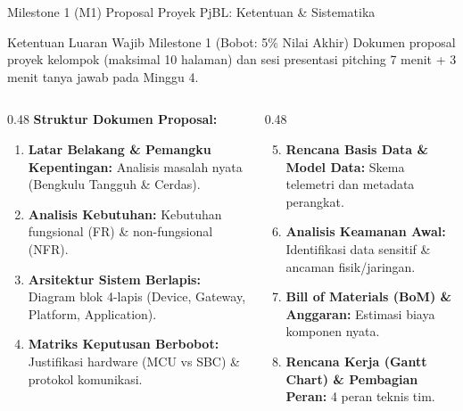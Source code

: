 \documentclass[aspectratio=169,10pt]{beamer}
\begin{document}
\begin{frame}{Milestone 1 (M1) Proposal Proyek PjBL: Ketentuan \& Sistematika}
    \begin{block}{Ketentuan Luaran Wajib Milestone 1 (Bobot: 5\% Nilai Akhir)}
        Dokumen proposal proyek kelompok (maksimal 10 halaman) dan sesi presentasi pitching 7 menit + 3 menit tanya jawab pada Minggu 4.
    \end{block}
    \vspace{4pt}
    \begin{columns}[T]
        \begin{column}{0.48\textwidth}
            \textbf{Struktur Dokumen Proposal:}
            \begin{enumerate}
                \item \textbf{Latar Belakang \& Pemangku Kepentingan:} Analisis masalah nyata (Bengkulu Tangguh \& Cerdas).
                \item \textbf{Analisis Kebutuhan:} Kebutuhan fungsional (FR) \& non-fungsional (NFR).
                \item \textbf{Arsitektur Sistem Berlapis:} Diagram blok 4-lapis (Device, Gateway, Platform, Application).
                \item \textbf{Matriks Keputusan Berbobot:} Justifikasi hardware (MCU vs SBC) \& protokol komunikasi.
            \end{enumerate}
        \end{column}
        \begin{column}{0.48\textwidth}
            \begin{enumerate}\setcounter{enumi}{4}
                \item \textbf{Rencana Basis Data \& Model Data:} Skema telemetri dan metadata perangkat.
                \item \textbf{Analisis Keamanan Awal:} Identifikasi data sensitif \& ancaman fisik/jaringan.
                \item \textbf{Bill of Materials (BoM) \& Anggaran:} Estimasi biaya komponen nyata.
                \item \textbf{Rencana Kerja (Gantt Chart) \& Pembagian Peran:} 4 peran teknis tim.
            \end{enumerate}
        \end{column}
    \end{columns}
\end{frame}
\end{document}
